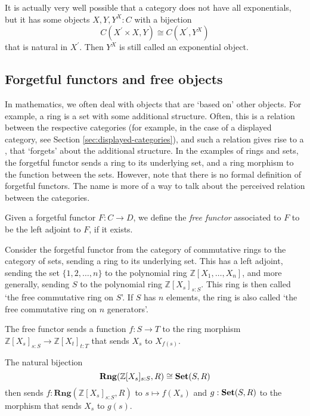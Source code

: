 \begin{remark}
  It is actually very well possible that a category does not have all exponentials, but it has some objects $ X, Y, Y^X: C $ with a bijection
  \[ C(X^\prime \times X, Y) \cong C(X^\prime, Y^X) \]
  that is natural in $ X^\prime $. Then $ Y^X $ is still called an exponential object.
\end{remark}

\subsection{Forgetful functors and free objects}

In mathematics, we often deal with objects that are `based on' other objects. For example, a ring is a set with some additional structure. Often, this is a relation between the respective categories (for example, in the case of a displayed category, see Section \ref{sec:displayed-categories}), and such a relation gives rise to a , that `forgets' about the additional structure. In the examples of rings and sets, the forgetful functor sends a ring to its underlying set, and a ring morphism to the function between the sets. However, note that there is no formal definition of forgetful functors. The name is more of a way to talk about the perceived relation between the categories.

\begin{definition}
  Given a forgetful functor $ F: C \to D $, we define the \textit{free functor} associated to $ F $ to be the left adjoint to $ F $, if it exists.
\end{definition}

\begin{example}
  Consider the forgetful functor from the category of commutative rings to the category of sets, sending a ring to its underlying set. This has a left adjoint, sending the set $ \{ 1, 2, \dots, n \} $ to the polynomial ring $ \mathbb Z[X_1, \dots, X_n] $, and more generally, sending $ S $ to the polynomial ring $ \mathbb Z[X_s]_{s : S} $. This ring is then called `the free commutative ring on $ S $'. If $ S $ has $ n $ elements, the ring is also called `the free commutative ring on $ n $ generators'.

  The free functor sends a function $ f: S \to T $ to the ring morphism $ \mathbb Z[X_s]_{s: S} \to \mathbb Z[X_t]_{t: T} $ that sends $ X_s $ to $ X_{f(s)} $.

  The natural bijection
  \[ \mathbf{Rng}(\mathbb Z[X_s]_{s : S}, R) \cong \mathbf{Set}(S, R) \]
  then sends $ f: \mathbf{Rng}(\mathbb Z[X_s]_{s : S}, R) $ to $ s \mapsto f(X_s) $ and $ g: \mathbf{Set}(S, R) $ to the morphism that sends $ X_s $ to $ g(s) $.
\end{example}

